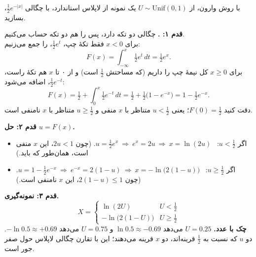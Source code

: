 \begin{exercise}
با روش  وارون، از $U\sim\mathrm{Unif}(0,1)$ یک نمونه از لاپلاس استاندارد، با چگالی $\frac12e^{-|x|}$، بسازید.
\begin{solution}
\textbf{قدم ۱: .} چگالی دو تکه دارد، پس  را هم دو تکه حساب می‌کنیم.\\
برای $x<0$ فقط تکهٔ چپ، $\frac12e^{t}$، را جمع می‌زنیم:
\[ F(x)=\int_{-\infty}^x\tfrac12e^{t}\,dt=\tfrac12e^{x}. \]
برای $x\ge0$ کل نیمهٔ چپ را داریم (که مساحتش $\frac12$ است) و از ۰ تا $x$ هم تکهٔ راست، $\frac12e^{-t}$، اضافه می‌شود:
\[ F(x)=\tfrac12+\int_0^x\tfrac12e^{-t}\,dt=\tfrac12+\tfrac12\bigl(1-e^{-x}\bigr)=1-\tfrac12e^{-x}. \]
دقت کنید $F(0)=\frac12$؛ یعنی $u<\frac12$ متناظر با $x$ منفی و $u\ge\frac12$ متناظر با $x$ نامنفی است.

\textbf{قدم ۲: حل $u=F(x)$.}
\begin{itemize}
  \item اگر $u<\frac12$: \ $u=\frac12e^{x}\ \Rightarrow\ e^x=2u\ \Rightarrow\ x=\ln(2u)$. (چون $2u<1$، این $x$ منفی است، همان‌طور که باید.)
  \item اگر $u\ge\frac12$: \ $u=1-\frac12e^{-x}\ \Rightarrow\ e^{-x}=2(1-u)\ \Rightarrow\ x=-\ln\bigl(2(1-u)\bigr)$. (چون $2(1-u)\le1$، این $x$ نامنفی است.)
\end{itemize}

\textbf{قدم ۳: نمونه‌گیری.}
\[ X=\begin{cases}\ln(2U) & U<\frac12\\[3pt] -\ln\bigl(2(1-U)\bigr) & U\ge\frac12\end{cases} \]
\textbf{چک با عدد.} $U=0.25$ می‌دهد $\ln0.5\approx-0.69$ و $U=0.75$ می‌دهد $-\ln0.5\approx+0.69$. دو $u$ که نسبت به $\frac12$ قرینه‌اند، دو $x$ قرینه می‌دهند؛ این با تقارن چگالی لاپلاس حول صفر جور است.
\end{solution}
\end{exercise}

